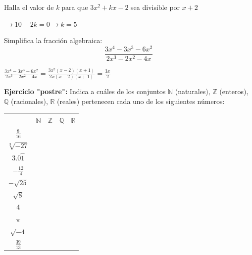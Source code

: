 \documentclass[addpoints,spanish, 12pt,a4paper]{exam}
\begin{document}
\begin{questions}



\question[1] Halla el valor de \emph{k} para que $3x^2+kx-2$ sea divisible por $x+2$
\begin{solution} $\to 10-2k=0 \to k=5 $ \end{solution}

\addpoints

%

\question[1] Simplifica la fracción algebraica: $$\frac{3 x^{4} - 3 x^{3} - 6 x^{2}}{2 x^{3} - 2 x^{2} - 4 x}$$
\begin{solution} $\frac{3 x^{4} - 3 x^{3} - 6 x^{2}}{2 x^{3} - 2 x^{2} - 4 x}=\frac{3 x^{2} \left(x - 2\right) \left(x + 1\right)}{2 x \left(x - 2\right) \left(x + 1\right)}=\frac{3 x}{2}$  \end{solution}

%


        \question[1] \textbf{Ejercicio "postre":} Indica a cuáles de los conjuntos
$\mathbb{N}$ (naturales), $\mathbb{Z}$ (enteros), $\mathbb{Q}$ (racionales), $\mathbb{R}$ (reales) pertenecen cada uno de los siguientes números:
\begin{center}
\begin{tabular}{|c |c |c |c |c|}\hline
&$\mathbb{N}$& $\mathbb{Z}$& $\mathbb{Q}$&$\mathbb{R}$\\ 
\hline
$\frac{8}{16}$&&&&\\
\hline
$\sqrt[3]{-27}$&&&&\\
\hline
$3.0\wideparen{1}$&&&&\\
\hline
$-\frac{12}{4}$&&&&\\
\hline
$-\sqrt{25}$&&&&\\
\hline
$\sqrt{8}$&&&&\\
\hline
$4$&&&&\\
\hline
$\pi$&&&&\\
\hline
$\sqrt{-4}$&&&&\\
\hline
$\frac{39}{13}$&&&&\\
\hline
\end{tabular}


\end{center}
\end{questions}
\end{document}
